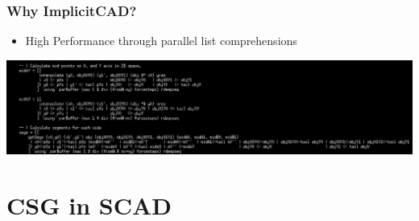 \documentclass{beamer}
\begin{document}
\begin{frame}
\frametitle{Why ImplicitCAD?}
\begin{itemize}
\item High Performance through parallel list comprehensions
\end{itemize}
\includegraphics[width=1.0\textwidth, left]{2D_render_000.png}
\end{frame}

\section{CSG in SCAD}
\end{document}
